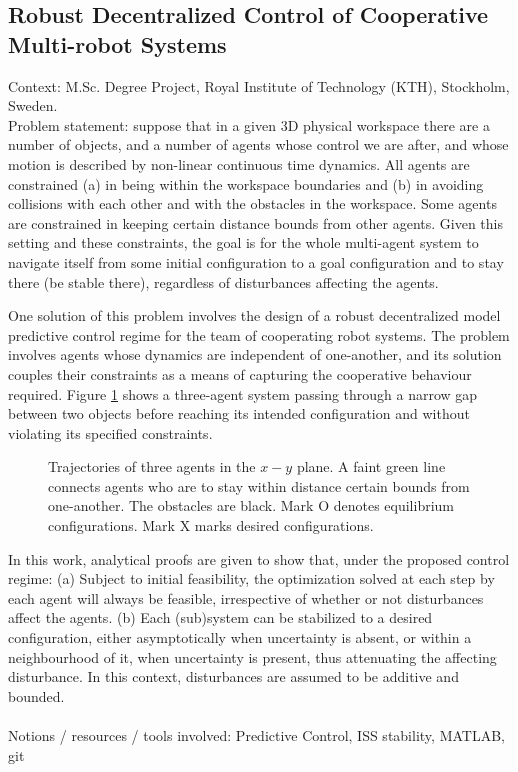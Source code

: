 \subsection{Robust Decentralized Control of Cooperative Multi-robot Systems}

Context: M.Sc. Degree Project, Royal Institute of Technology (KTH), Stockholm, Sweden.\\

Problem statement: suppose that in a given 3D physical workspace there are
a number of objects, and a number of agents whose control we are after, and
whose motion is described by non-linear continuous time dynamics. All agents
are constrained (a) in being within the workspace boundaries and (b) in avoiding
collisions with each other and with the obstacles in the workspace. Some agents
are constrained in keeping certain distance bounds from other agents. Given this
setting and these constraints, the goal is for the whole multi-agent system to
navigate itself from some initial configuration to a goal configuration and to
stay there (be stable there), regardless of disturbances affecting the agents.

One solution of this problem involves the design of a robust decentralized model
predictive control regime for the team of cooperating robot systems. The problem
involves agents whose dynamics are independent of one-another, and its solution
couples their constraints as a means of capturing the cooperative behaviour required.
Figure \ref{fig:d_OFF_res_trajectory_3_2} shows a three-agent system passing
through a narrow gap between two objects before reaching its intended
configuration and without violating its specified constraints.

\begin{figure}[H]
  \scalebox{0.8}{}
  \caption{Trajectories of three agents in the $x-y$ plane. A faint green line
    connects agents who are to stay within distance certain bounds from
    one-another. The obstacles are black. Mark O denotes equilibrium
    configurations. Mark X marks desired configurations.}
  \label{fig:d_OFF_res_trajectory_3_2}
\end{figure}



In this work, analytical proofs are given to show that, under the proposed
control regime: (a) Subject to initial feasibility, the optimization solved at
each step by each agent will always be feasible, irrespective of whether or not
disturbances affect the agents. (b) Each (sub)system can be stabilized to a
desired configuration, either asymptotically when uncertainty is absent,
or within a neighbourhood of it, when uncertainty is present, thus attenuating
the affecting disturbance. In this context, disturbances are assumed to be
additive and bounded.\\\\
Notions / resources / tools involved: Predictive Control, ISS stability, MATLAB, git

